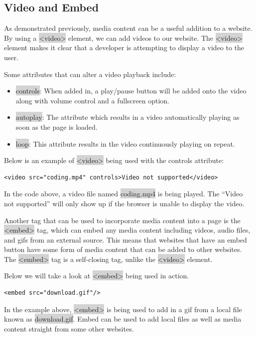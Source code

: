 \documentclass[11pt]{article}
\begin{document}
\subsection{Video and Embed}
As demonstrated previously, media content can be a useful addition to a website. By using a \colorbox{lightgray}{<video>} element, we can add videos to our website. The \colorbox{lightgray}{<video>} element makes it clear that a developer is attempting to display a video to the user.

Some attributes that can alter a video playback include:
\begin{itemize}[leftmargin = *]
\item \colorbox{lightgray}{controls}: When added in, a play/pause button will be added onto the video along with volume control and a fullscreen option.
\item \colorbox{lightgray}{autoplay}: The attribute which results in a video automatically playing as soon as the page is loaded.
\item \colorbox{lightgray}{loop}: This attribute results in the video continuously playing on repeat.
\end{itemize}
Below is an example of \colorbox{lightgray}{<video>} being used with the controls attribute:
\begin{lstlisting}
<video src="coding.mp4" controls>Video not supported</video>
\end{lstlisting}
In the code above, a video file named \colorbox{lightgray}{coding.mp4} is being played. The “Video not supported” will only show up if the browser is unable to display the video.

Another tag that can be used to incorporate media content into a page is the \colorbox{lightgray}{<embed>} tag, which can embed any media content including videos, audio files, and gifs from an external source. This means that websites that have an embed button have some form of media content that can be added to other websites. The \colorbox{lightgray}{<embed>} tag is a self-closing tag, unlike the \colorbox{lightgray}{<video>} element.

Below we will take a look at \colorbox{lightgray}{<embed>} being used in action.
\begin{lstlisting}
<embed src="download.gif"/>
\end{lstlisting}
In the example above, \colorbox{lightgray}{<embed>} is being used to add in a gif from a local file known as \colorbox{lightgray}{download.gif}. Embed can be used to add local files as well as media content straight from some other websites.
\end{document}
